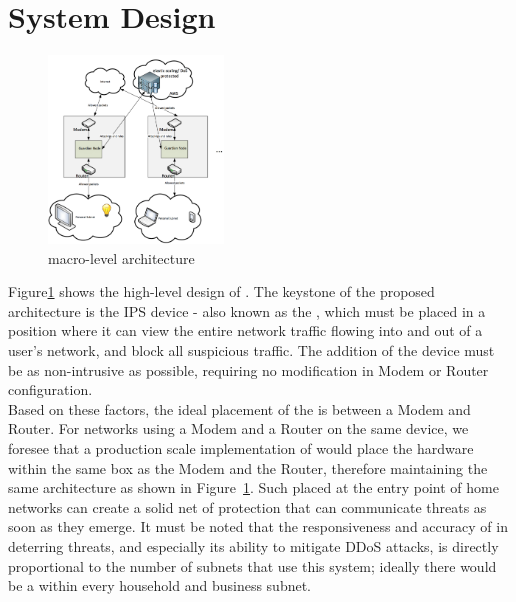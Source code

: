 \section{System Design}

\begin{figure}
    \centering
    \includegraphics[height=5cm]{figs/macro.png}
    \caption{\sysname macro-level architecture}
    \label{fig:macro}
\end{figure}


\label{sec:design}

Figure\ref{fig:macro} shows the high-level design of \sysname. The keystone of the proposed architecture is the \sysname IPS device - also known as the \nodename, which must be placed in a position where it can view the entire network traffic flowing into and out of a user's network, and block all suspicious traffic. The addition of the device must be as non-intrusive as possible, requiring no modification in Modem or Router configuration. \\

Based on these factors, the ideal placement of the \nodename is between a Modem and Router. For networks using a Modem and a Router on the same device, we foresee that a production scale implementation of \sysname would place the \nodename hardware within the same box as the Modem and the Router, therefore maintaining the same architecture as shown in Figure~\ref{fig:macro}. Such \nodenames placed at the entry point of home networks can create a solid net of protection that can communicate threats as soon as they emerge. It must be noted that the responsiveness and accuracy of \sysname in deterring threats, and especially its ability to mitigate DDoS attacks, is directly proportional to the number of subnets that use this system; ideally there would be a \nodename within every household and business subnet.

\subsection{\nodename}
\label{sec:design:guardian}

